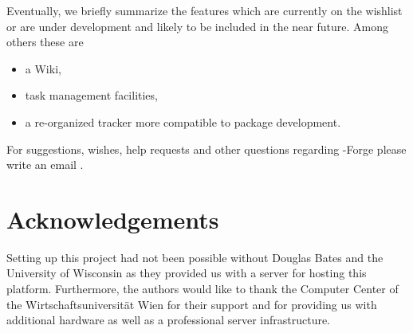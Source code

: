 Eventually, we briefly summarize the features which are currently on
the wishlist or are under development and likely to be included in the
near future. Among others these are

\begin{itemize}
\item a Wiki,
\item task management facilities,
\item a re-organized tracker more compatible to \R{} package development. 
\end{itemize}

For suggestions, wishes, help requests and other questions regarding
\R{}-Forge please write an email .

\section{Acknowledgements}

Setting up this project had not been possible without Douglas
Bates and the University of Wisconsin as they provided us with a
server for hosting this platform. Furthermore, 
the authors would like to thank the Computer Center 
of the Wirtschaftsuniversit\"at Wien for
their support and for providing us with additional hardware as well as a
professional server infrastructure.

